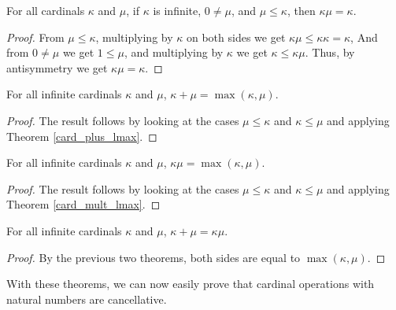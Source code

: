 \documentclass[../../math.tex]{subfiles}
\begin{document}
\begin{theorem} \label{card_mult_lmax}
    For all cardinals $\kappa$ and $\mu$, if $\kappa$ is infinite, $0 \neq \mu$,
    and $\mu \leq \kappa$, then $\kappa \mu = \kappa$.
\end{theorem}
\begin{proof}
    From $\mu \leq \kappa$, multiplying by $\kappa$ on both sides we get $\kappa
    \mu \leq \kappa \kappa = \kappa$,  And from $0 \neq \mu$ we get $1 \leq
    \mu$, and multiplying by $\kappa$ we get $\kappa \leq \kappa \mu$.  Thus, by
    antisymmetry we get $\kappa \mu = \kappa$.
\end{proof}

\begin{theorem} \label{card_plus_max}
    For all infinite cardinals $\kappa$ and $\mu$, $\kappa + \mu = \max(\kappa,
    \mu)$.
\end{theorem}
\begin{proof}
    The result follows by looking at the cases $\mu \leq \kappa$ and $\kappa
    \leq \mu$ and applying Theorem \ref{card_plus_lmax}.
\end{proof}

\begin{theorem} \label{card_mult_max}
    For all infinite cardinals $\kappa$ and $\mu$, $\kappa \mu = \max(\kappa,
    \mu)$.
\end{theorem}
\begin{proof}
    The result follows by looking at the cases $\mu \leq \kappa$ and $\kappa
    \leq \mu$ and applying Theorem \ref{card_mult_lmax}.
\end{proof}

\begin{theorem} \label{card_inf_plus_mult}
    For all infinite cardinals $\kappa$ and $\mu$, $\kappa + \mu = \kappa\mu$.
\end{theorem}
\begin{proof}
    By the previous two theorems, both sides are equal to $\max(\kappa, \mu)$.
\end{proof}

With these theorems, we can now easily prove that cardinal operations with
natural numbers are cancellative.
\end{document}
